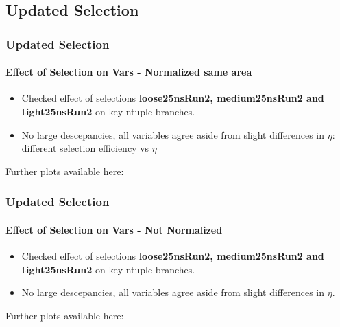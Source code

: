 \documentclass[8pt,serif]{beamer}
\begin{document}
\subsection{Updated Selection}
\begin{frame}
\frametitle{Updated Selection}
\framesubtitle{Effect of Selection on Vars - Normalized same area}

\vspace{10mm}

\begin{itemize}
\item Checked effect of selections \textbf{loose25nsRun2, medium25nsRun2 and tight25nsRun2} on key ntuple branches.
\item No large descepancies, all variables agree aside from slight differences in $\eta$: different selection efficiency vs $\eta$
\end{itemize}
  

Further plots available here:	\href{https://lcorpe.web.cern.ch/lcorpe/MoCa/data-data/moca-talk-131115/data-data-data-selection-plots/}{}
\end{frame}
\begin{frame}
\frametitle{Updated Selection}
\framesubtitle{Effect of Selection on Vars - Not Normalized}

\vspace{10mm}

\begin{itemize}
\item Checked effect of selections \textbf{loose25nsRun2, medium25nsRun2 and tight25nsRun2} on key ntuple branches.
\item No large descepancies, all variables agree aside from slight differences in $\eta$. 
\end{itemize}
  
Further plots available here:	\href{https://lcorpe.web.cern.ch/lcorpe/MoCa/data-data/moca-talk-131115/data-data-data-selection-plots/}{}
\end{frame}
\end{document}
